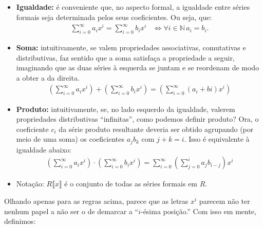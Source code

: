 \begin{itemize}
    \item \textbf{Igualdade:} é conveniente que, no aspecto formal, a igualdade entre séries formais seja determinada pelos seus coeficientes. Ou seja, que:
    \begin{align*}
      \sum_{i=0}^\infty a_ix^i=\sum_{i=0}^\infty b_ix^i & \Leftrightarrow \forall i\in \mathbb N\, a_i= b_i.
    \end{align*}
    \item \textbf{Soma:} intuitivamente, se valem propriedades associativas, comutativas e distributivas, faz sentido que a soma satisfaça a propriedade a seguir, imaginando que as duas séries à esquerda se juntam e se reordenam de modo a obter a da direita.
    \begin{align*}
        \left(\sum_{i=0}^\infty a_ix^i\right)+\left(\sum_{i=0}^\infty b_ix^i\right)=\left(\sum_{i=0}^\infty (a_i+bi)x^i\right)
    \end{align*}
    \item \textbf{Produto:} intuitivamente, se, no lado esquerdo da igualdade, valerem propriedades distributivas ``infinitas'', como podemos definir produto? Ora, o coeficiente $c_i$ da série produto resultante deveria ser obtido agrupando (por meio de uma soma) os coeficientes $a_jb_k$ com $j+k=i$. Isso é equivalente à igualdade abaixo:
    \begin{align*}
        \left(\sum_{i=0}^\infty a_ix^i\right)\cdot\left(\sum_{i=0}^\infty b_ix^i\right)=\sum_{i=0}^\infty \left(\sum_{j=0}^i a_{j}b_{i-j}\right)x^i
    \end{align*}
    \item Notação: $R\llbracket x \rrbracket$ é o conjunto de todas as séries formais em $R$.
\end{itemize}
Olhando apenas para as regras acima, parece que as letras $x^i$ parecem não ter nenhum papel a não ser o de demarcar a ``$i$-ésima posição.'' Com isso em mente, definimos:
